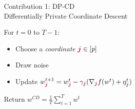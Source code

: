 \documentclass[17pt,aspectratio=169]{beamer}
\begin{document}
\begin{frame}{Contribution 1: DP-CD \\[-0.5em]
    \normalsize Differentially Private Coordinate Descent}

  \small
  For $t = 0$ to $T-1$:
  \begin{itemize}
    \setlength\itemsep{0.5em}
  \item Choose a \emph{coordinate ${\boldsymbol{\textcolor{purple}{j}}} \in [p]$}
  \item Draw noise
  \item Update $w_{\boldsymbol{\textcolor{purple}{j}}}^{t+1} = w_{\boldsymbol{\textcolor{purple}{j}}}^t - \gamma_{\boldsymbol{\textcolor{purple}{j}}} ( \nabla_{\boldsymbol{\textcolor{purple}{j}}} f( w^t ) + \eta_{\boldsymbol{\textcolor{purple}{j}}}^t )$
  \end{itemize}
  \vspace{0.5em}

  Return $w^{CD} = \frac{1}{T} \sum_{t=1}^T w^t$


\vspace{0.9em}

\end{frame}
\end{document}

